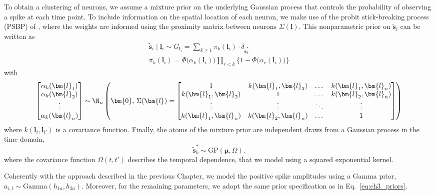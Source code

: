 To obtain a clustering of neurons, we assume a mixture prior on the underlying Gaussian process that controls the probability of observing a spike at each time point. 
To include information on the spatial location of each neuron, we make use of the probit stick-breaking process (PSBP) of \textcite{rodriguez2011}, where the weights are informed using the proximity matrix between neurons $\Sigma(\bm{l})$.
This nonparametric prior on $\tilde{\bm{s}}_i$ can be written as
\begin{equation}
\begin{gathered}
\tilde{\bm{s}}_i\mid \bm{l}_i  \sim G_{\bm{l}_i} = \sum_{k\geq1} \pi_k(\bm{l}_i)\cdot \delta_{\tilde{\bm{s}}^*_k }\\
\pi_k(\bm{l}_i) = \Phi\big(\alpha_k(\bm{l}_i)\big) \prod_{r<k} \big\{ 1- \Phi\big(\alpha_r(\bm{l}_i)\big)\big\}
\end{gathered}
\end{equation}
with 
\begin{equation*}
\begin{bmatrix}
\alpha_k(\bm{l}_1) \\
\alpha_k(\bm{l}_2) \\
\vdots \\
\alpha_k(\bm{l}_n) 
\end{bmatrix} \sim \N_n \left(
\bm{0},\, \Sigma(\bm{l}) = 
\begin{bmatrix}
1 & k(\bm{l}_1,\bm{l}_2) & \dots & k(\bm{l}_1,\bm{l}_n)\\
k(\bm{l}_1,\bm{l}_2) & 1 & \dots & k(\bm{l}_2,\bm{l}_n) \\
\vdots & \vdots & \ddots & \vdots \\
k(\bm{l}_1,\bm{l}_n) & k(\bm{l}_2,\bm{l}_n) & \dots & 1
\end{bmatrix}
\right)
\end{equation*}
where $k(\bm{l}_i,\bm{l}_{i'})$ is a covariance function. Finally, the atoms of the mixture prior are independent draws from a Gaussian process in the time domain, 
\begin{equation*}
\tilde{\bm{s}}^*_k \sim \mathrm{GP}(\bm{\mu},\Omega).
\end{equation*}
where the covariance function $\Omega(t,t')$ describes the temporal dependence, that we model using a squared exponential kernel.

Coherently with the approach described in the previous Chapter, we model the positive spike amplitudes using a Gamma prior, $a_{i,t}\sim\mathrm{Gamma}(h_{1a},h_{2a})$. Moreover, for the remaining parameters, we adopt the same prior specification as in Eq.~\eqref{eq:ch3_priors}.


